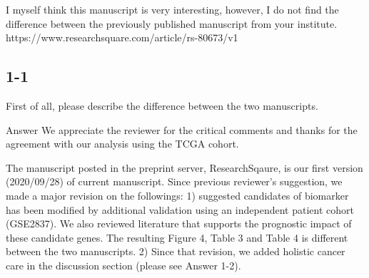 \documentclass[preprint,12pt]{elsarticle}
\newenvironment{MyColorPar}[1]{%
    \leavevmode\color{#1}\ignorespaces%
}{%
}%
\begin{document}
I myself think this manuscript is very interesting, however, I do not find the difference between the previously published manuscript from your institute.
https://www.researchsquare.com/article/rs-80673/v1

\subsection*{1-1}
First of all, please describe the difference between the two manuscripts.




\begin{MyColorPar}{blue}
Answer
We appreciate the reviewer for the critical comments and thanks for the agreement with our analysis using the TCGA cohort.

The manuscript posted in the preprint server, ResearchSqaure, is our first version (2020/09/28) of current manuscript. 
Since previous reviewer's suggestion, we made a major revision on the followings:
1) suggested candidates of biomarker has been modified  by additional validation using an independent patient cohort (GSE2837).
We also reviewed literature that supports the prognostic impact of these candidate genes. The resulting Figure 4, Table 3 and Table 4 is different between the two manuscripts.
2) Since that revision, we added holistic cancer care in the discussion section (please see Answer 1-2).%





\end{MyColorPar}
\end{document}
